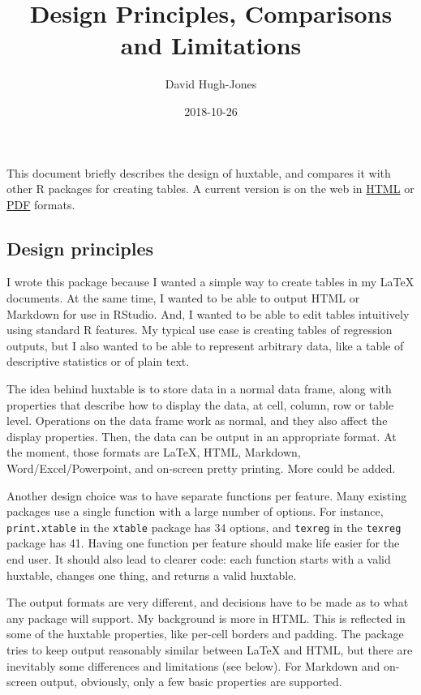 \documentclass[]{article}
\title{Design Principles, Comparisons and Limitations}
\author{David Hugh-Jones}
\date{2018-10-26}
\begin{document}
\maketitle

This document briefly describes the design of huxtable, and compares it
with other R packages for creating tables. A current version is on the
web in
\href{http://hughjonesd.github.io/huxtable/design-principles.html}{HTML}
or
\href{http://hughjonesd.github.io/huxtable/design-principles.pdf}{PDF}
formats.

\hypertarget{design-principles}{%
\subsection{Design principles}\label{design-principles}}

I wrote this package because I wanted a simple way to create tables in
my LaTeX documents. At the same time, I wanted to be able to output HTML
or Markdown for use in RStudio. And, I wanted to be able to edit tables
intuitively using standard R features. My typical use case is creating
tables of regression outputs, but I also wanted to be able to represent
arbitrary data, like a table of descriptive statistics or of plain text.

The idea behind huxtable is to store data in a normal data frame, along
with properties that describe how to display the data, at cell, column,
row or table level. Operations on the data frame work as normal, and
they also affect the display properties. Then, the data can be output in
an appropriate format. At the moment, those formats are LaTeX, HTML,
Markdown, Word/Excel/Powerpoint, and on-screen pretty printing. More
could be added.

Another design choice was to have separate functions per feature. Many
existing packages use a single function with a large number of options.
For instance, \texttt{print.xtable} in the \texttt{xtable} package has
34 options, and \texttt{texreg} in the \texttt{texreg} package has 41.
Having one function per feature should make life easier for the end
user. It should also lead to clearer code: each function starts with a
valid huxtable, changes one thing, and returns a valid huxtable.

The output formats are very different, and decisions have to be made as
to what any package will support. My background is more in HTML. This is
reflected in some of the huxtable properties, like per-cell borders and
padding. The package tries to keep output reasonably similar between
LaTeX and HTML, but there are inevitably some differences and
limitations (see below). For Markdown and on-screen output, obviously,
only a few basic properties are supported.
\end{document}
